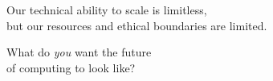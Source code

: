 \documentclass[aspectratio=169]{beamer}
\begin{document}
\begin{frame}[standout]
    \centering

    \large
    Our technical ability to scale is \alert{limitless},\\
    but our resources and ethical boundaries are \alert{limited}.

    \vspace{3em} %

    \Huge
    What do \textit{you} want the future\\[0.2em]
    of computing to look like?

\end{frame}
\end{document}
